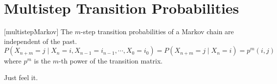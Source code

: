 \documentclass[../probability.tex]{subfiles}
\begin{document}
\section{Multistep Transition Probabilities}

\begin{Theorem}{}[multistepMarkov]
    The \(m\)-step transition probabilities of a Markov chain
    are independent of the past.
    \[
        P(X_{n+m}=j \mid X_n = i, X_{n-1} = i_{n-1}, \cdots, X_0 = i_0)
        = P(X_{n+m}=j \mid X_n = i)
        = p^m(i, j)
    \]
    where \(p^m\) is the \(m\)-th power of the transition matrix.
\end{Theorem}
\begin{myproof}[Proof]
    Just feel it.
\end{myproof}
\end{document}
